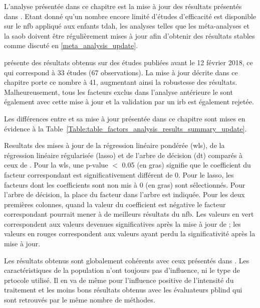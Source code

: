L'analyse présentée dans ce chapitre est la mise à jour des résultats présentés dans \citet{Bussalb2019clinical}. Etant donné qu'un nombre encore limité d'études
d'efficacité est disponible sur le \gls{nfb} appliqué aux enfants \gls{tdah}, les analyses telles que les méta-analyses et la \gls{saob} doivent être régulièrement mises
à jour afin d'obtenir des résultats stables comme discuté en \ref{meta_analysis_update}.

\citet{Bussalb2019clinical} présente des résultats obtenus sur des études publiées avant le 12 février 2018, ce qui correspond à 33 études (67 observations). La mise 
à jour décrite dans ce chapitre porte ce nombre à 41, augmentant ainsi la robustesse des
résultats. Malheureusement, tous les facteurs exclus dans l'analyse antérieure le sont également avec cette mise à jour et la validation par
un \gls{irb} est également rejetée.

Les différences entre \citet{Bussalb2019clinical} et sa mise à jour présentée dans ce chapitre sont mises en évidence à la 
Table~\ref{Table:table_factors_analysis_results_summary_update}.

\begin{table}[h!]
  \centering
  \caption{Resultats des mises à jour de la régression linéaire pondérée (\gls{wls}), de la régression linéaire régularisée (\gls{lasso}) et de l'arbre de décision (\gls{dt})
	comparés à ceux de \citet{Bussalb2019clinical}. Pour la \gls{wls}, une p-value $<$ 0.05 
	(en gras) signifie que le coefficient du facteur correspondant est significativement différent de 0. Pour le \gls{lasso}, les facteurs dont les coefficients sont non mis à 0 (en gras) sont 
	sélectionnés. Pour l'arbre de décision, la place du facteur dans l'arbre est indiquée. Pour les deux premières colonnes, quand la valeur du coefficient est négative le facteur 
	correspondant pourrait mener à de meilleurs résultats du \gls{nfb}. Les valeurs en vert correspondent aux valeurs devenues significatives après la mise à jour de \citet{Bussalb2019clinical}; les valeurs
	en rouges correspondent aux valeurs ayant perdu la significativité après la mise à jour.}
  
  \label{Table:table_factors_analysis_results_summary_update}
\end{table}

Les résultats obtenus sont globalement cohérents avec ceux présentés dans \citet{Bussalb2019clinical}. Les caractéristiques de la population n'ont toujours pas d'influence, ni
le type de prtocole utilisé. Il en va de même pour l'influence positive de l'intensité du traitement et les moins bons résultats obtenus avec les évaluateurs \gls{pblind} qui sont
retrouvés par le même nombre de méthodes. 

